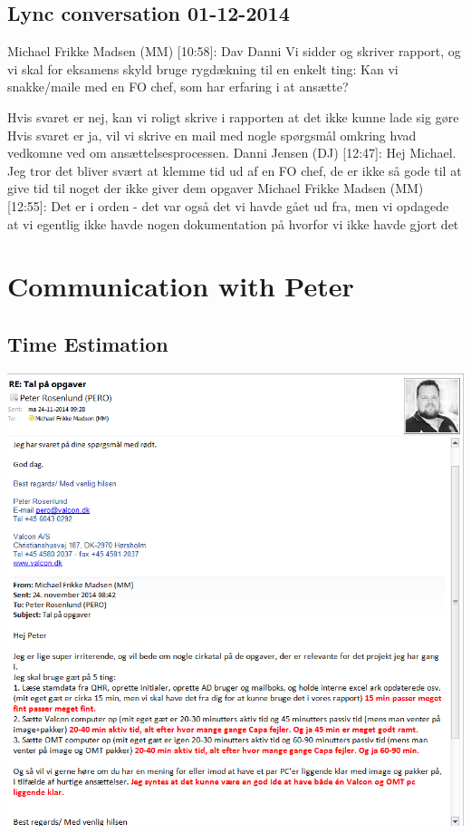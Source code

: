 \begin{linenumbers*}
\subsection{Lync conversation 01-12-2014}
Michael Frikke Madsen (MM) [10:58]: 
Dav Danni
Vi sidder og skriver rapport, og vi skal for eksamens skyld bruge rygdækning til en enkelt ting:
Kan vi snakke/maile med en FO chef, som har erfaring i at ansætte?

Hvis svaret er nej, kan vi roligt skrive i rapporten at det ikke kunne lade sig gøre
Hvis svaret er ja, vil vi skrive en mail med nogle spørgsmål omkring hvad vedkomne ved om ansættelsesprocessen. \newline
Danni Jensen (DJ) [12:47]: 
Hej Michael. Jeg tror det bliver svært at klemme tid ud af en FO chef, de er ikke så gode til at give tid til noget der ikke giver dem opgaver \newline
{}
Michael Frikke Madsen (MM) [12:55]: 
Det er i orden - det var også det vi havde gået ud fra, men vi opdagede at vi egentlig ikke havde nogen dokumentation på hvorfor vi ikke havde gjort det 

\section{Communication with Peter}

\subsection{Time Estimation}
\label{app:peter_time_estimation}
\includegraphics[width=1.36\textwidth]{appendix/peter_communication_1}


\end{linenumbers*}
